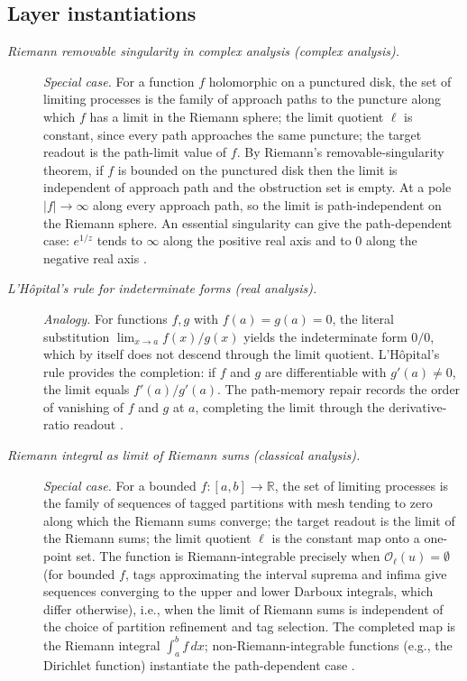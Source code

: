 \subsection*{Layer instantiations}\label{layer-inst:F36}

\begingroup\small
\begin{description}
\item[\emph{Riemann removable singularity in complex
analysis (complex analysis).}] \textit{Special case.}
For a function \(f\) holomorphic on a punctured disk,
the set of limiting processes is the family of
approach paths to the puncture along which \(f\) has a
limit in the Riemann sphere; the limit quotient
\(\ell\) is constant, since every path approaches the same puncture; the
target readout is the path-limit value of \(f\).  By
Riemann's removable-singularity theorem, if \(f\) is
bounded on the punctured disk then the limit is
independent of approach path and the obstruction set
is empty.  At a pole
\(|f|\to\infty\) along every approach path, so the limit is
path-independent on the Riemann sphere.  An essential
singularity can give the path-dependent case: \(e^{1/z}\) tends
to \(\infty\) along the positive real axis and to \(0\) along the
negative real axis
\citep{Ahlfors1979ComplexAnalysis}.

\item[\emph{L'H\^opital's rule for indeterminate
forms (real analysis).}] \textit{Analogy.}
For functions \(f,g\) with \(f(a)=g(a)=0\), the
literal substitution \(\lim_{x\to a}f(x)/g(x)\)
yields the indeterminate form \(0/0\), which by
itself does not descend through the limit quotient.
L'H\^opital's rule provides the completion: if \(f\)
and \(g\) are differentiable with \(g'(a)\ne 0\),
the limit equals \(f'(a)/g'(a)\).  The path-memory
repair records the order of vanishing of \(f\) and
\(g\) at \(a\), completing the limit through the
derivative-ratio readout
\citep{Cauchy1821CoursAnalyse}.

\item[\emph{Riemann integral as limit of Riemann sums
(classical analysis).}] \textit{Special case.}
For a bounded \(f:[a,b]\to\mathbb R\), the set of
limiting processes is the family of sequences of
tagged partitions with mesh tending to zero along
which the Riemann sums converge; the target readout
is the limit of the Riemann sums; the limit quotient \(\ell\) is the constant
map onto a one-point set.  The function is Riemann-integrable precisely when
\(\mathcal O_\ell(u)=\emptyset\) (for bounded \(f\), tags approximating the interval suprema
and infima give sequences converging to the upper and lower
Darboux integrals, which differ otherwise), i.e., when the limit of Riemann sums
is independent of the choice of partition
refinement and tag selection.  The completed map is
the Riemann integral
\(\int_a^b f\,dx\); non-Riemann-integrable functions
(e.g., the Dirichlet function) instantiate the
path-dependent case
\citep{Riemann1854Habilitationsschrift}.
\end{description}
\endgroup


